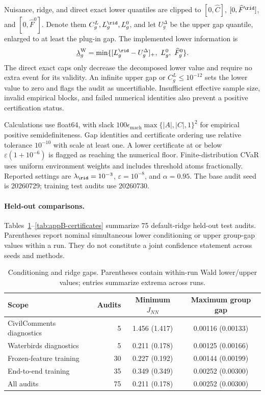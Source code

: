 Nuisance, ridge, and direct exact lower quantiles are clipped to $[0,\widehat C]$, $[0,\widehat F^{\rid}]$, and $[0,\widehat F^0]$. Denote them $C_g^L,L_g^{\rid},L_g^0$, and let $U_g^\Delta$ be the upper gap quantile, enlarged to at least the plug-in gap. The implemented lower information is
\begin{equation}
\underline\lambda_g^{\mathrm W}
=\min\{[L_g^{\rid}-U_g^\Delta]_+,\ L_g^0,\ \widehat F_g^0\}.
\label{eq:appB-wald-lower}
\end{equation}
The direct exact caps only decrease the decomposed lower value and require no extra event for its validity. An infinite upper gap or $C_g^L\le10^{-12}$ sets the lower value to zero and flags the audit as uncertifiable. Insufficient effective sample size, invalid empirical blocks, and failed numerical identities also prevent a positive certification status.

Calculations use float64, with slack $100\epsilon_{\mathrm{mach}}\max\{|A|,|C|,1\}^2$ for empirical positive semidefiniteness. Gap identities and certificate ordering use relative tolerance $10^{-10}$ with scale at least one. A lower certificate at or below $\varepsilon(1+10^{-6})$ is flagged as reaching the numerical floor. Finite-distribution CVaR uses uniform environment weights and includes threshold atoms fractionally. Reported settings are $\lambda_{\rid}=10^{-3}$, $\varepsilon=10^{-8}$, and $\alpha=0.95$. The base audit seed is 20260729; training test audits use 20260730.

\paragraph{Held-out comparisons.}
Tables~\ref{tab:appB-conditioning}--\ref{tab:appB-certificates} summarize 75 default-ridge held-out test audits. Parentheses report nominal simultaneous lower conditioning or upper group-gap values within a run. They do not constitute a joint confidence statement across seeds and methods.

\begin{table}[htbp]
\centering
\caption{Conditioning and ridge gaps. Parentheses contain within-run Wald lower/upper values; entries summarize extrema across runs.}
\label{tab:appB-conditioning}
\small
\begin{tabular}{@{}p{.35\linewidth}rcc@{}}
\toprule
Scope & Audits & Minimum $J_{NN}$ & Maximum group gap\\
\midrule
CivilComments diagnostics & 5 & 1.456 (1.417) & 0.00116 (0.00133)\\
Waterbirds diagnostics & 5 & 0.211 (0.178) & 0.00125 (0.00166)\\
Frozen-feature training & 30 & 0.227 (0.192) & 0.00144 (0.00199)\\
End-to-end training & 35 & 0.349 (0.349) & 0.00252 (0.00300)\\
\midrule
All audits & 75 & 0.211 (0.178) & 0.00252 (0.00300)\\
\bottomrule
\end{tabular}
\end{table}

